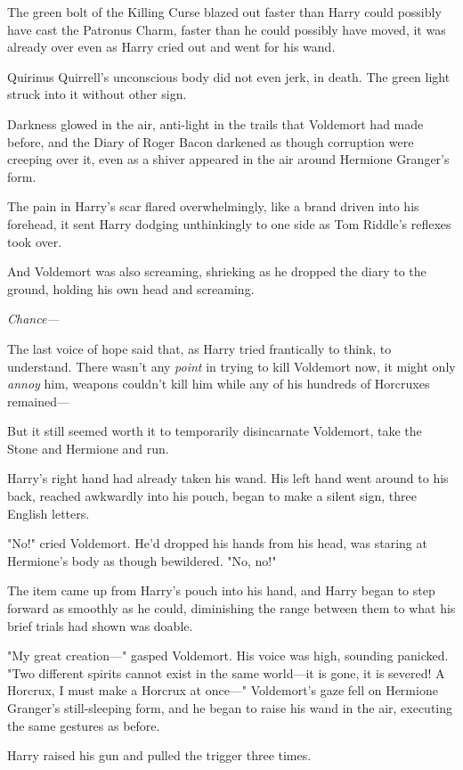 The green bolt of the Killing Curse blazed out faster than Harry could possibly
have cast the Patronus Charm, faster than he could possibly have moved, it was
already over even as Harry cried out and went for his wand.

Quirinus Quirrell's unconscious body did not even jerk, in death. The green
light struck into it without other sign.

Darkness glowed in the air, anti-light in the trails that Voldemort had made
before, and the Diary of Roger Bacon darkened as though corruption were
creeping over it, even as a shiver appeared in the air around Hermione
Granger's form.

The pain in Harry's scar flared overwhelmingly, like a brand driven into his
forehead, it sent Harry dodging unthinkingly to one side as Tom Riddle's
reflexes took over.

And Voldemort was also screaming, shrieking as he dropped the diary to the
ground, holding his own head and screaming.

\emph{Chance---}

The last voice of hope said that, as Harry tried frantically to think, to
understand. There wasn't any \emph{point} in trying to kill Voldemort now, it
might only \emph{annoy} him, weapons couldn't kill him while any of his
hundreds of Horcruxes remained\mbox{---}

But it still seemed worth it to temporarily disincarnate Voldemort, take the
Stone and Hermione and run.

Harry's right hand had already taken his wand. His left hand went around to his
back, reached awkwardly into his pouch, began to make a silent sign, three
English letters.

"No!" cried Voldemort. He'd dropped his hands from his head, was staring at
Hermione's body as though bewildered. "No, no!"

The item came up from Harry's pouch into his hand, and Harry began to step
forward as smoothly as he could, diminishing the range between them to what his
brief trials had shown was doable.

"My great creation\mbox{---}" gasped Voldemort. His voice was high, sounding panicked.
"Two different spirits cannot exist in the same world---it is gone, it is
severed! A Horcrux, I must make a Horcrux at once\mbox{---}" Voldemort's gaze fell on
Hermione Granger's still-sleeping form, and he began to raise his wand in the
air, executing the same gestures as before.

Harry raised his gun and pulled the trigger three times.
